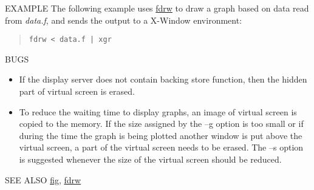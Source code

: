 \begin{options}
\end{options}
\begin{qsection}{EXAMPLE}
The following example uses \hyperlink{fdrw}{fdrw} to draw a graph based on data read
from {\em data.f}, and sends the output to a X-Window environment:
\begin{quote}
 \verb!fdrw < data.f | xgr!
\end{quote}
\end{qsection}
\begin{qsection}{BUGS}
\begin{itemize}
\item If the display server does not contain backing store function,
then the hidden part of virtual screen is erased.

\item To reduce the waiting time to display graphs,
an image of virtual screen is copied to the memory.
If the size assigned by the --g option is too small
or if during the time the graph is being plotted another window
is put above the virtual screen, a part of the virtual screen
needs to be erased.
The --s option is suggested whenever the size of
the virtual screen should be reduced.
\end{itemize}

\end{qsection}
\begin{qsection}{SEE ALSO}
\hyperlink{fig}{fig},
\hyperlink{fdrw}{fdrw}
\end{qsection}
